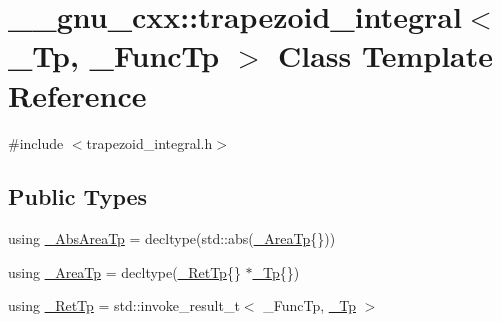 \hypertarget{class____gnu__cxx_1_1trapezoid__integral}{}\section{\+\_\+\+\_\+gnu\+\_\+cxx\+:\+:trapezoid\+\_\+integral$<$ \+\_\+\+Tp, \+\_\+\+Func\+Tp $>$ Class Template Reference}
\label{class____gnu__cxx_1_1trapezoid__integral}


{\ttfamily \#include $<$trapezoid\+\_\+integral.\+h$>$}

\subsection*{Public Types}
\begin{DoxyCompactItemize}
\item 
using \hyperlink{class____gnu__cxx_1_1trapezoid__integral_a14ad7fdce0a3abc725d8d07adb5d340e}{\+\_\+\+Abs\+Area\+Tp} = decltype(std\+::abs(\hyperlink{class____gnu__cxx_1_1trapezoid__integral_a41c7c672204caf0e1b842c3664aca85f}{\+\_\+\+Area\+Tp}\{\}))
\item 
using \hyperlink{class____gnu__cxx_1_1trapezoid__integral_a41c7c672204caf0e1b842c3664aca85f}{\+\_\+\+Area\+Tp} = decltype(\hyperlink{class____gnu__cxx_1_1trapezoid__integral_a0418b1ec467b97907150ed7ae82fe3bc}{\+\_\+\+Ret\+Tp}\{\} $\ast$\hyperlink{namespace____gnu__cxx_a3b19a9c800ca194374ef9172290f7d79}{\+\_\+\+Tp}\{\})
\item 
using \hyperlink{class____gnu__cxx_1_1trapezoid__integral_a0418b1ec467b97907150ed7ae82fe3bc}{\+\_\+\+Ret\+Tp} = std\+::invoke\+\_\+result\+\_\+t$<$ \+\_\+\+Func\+Tp, \hyperlink{namespace____gnu__cxx_a3b19a9c800ca194374ef9172290f7d79}{\+\_\+\+Tp} $>$
\end{DoxyCompactItemize}
